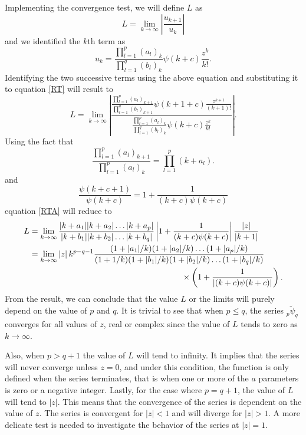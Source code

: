 Implementing the convergence test, we will define $L$ as
\begin{equation} \label{RT}
    L = \lim_{k \to \infty} \left| \frac{u_{k+1}}{u_k} \right| 
\end{equation}
and we identified the $k$th term as
\begin{equation}
    u_k = \frac{\prod_{l=1}^{p} (a_{l})_k}{ \prod_{l=1}^{q} (b_{l})_k} \psi(k+c) \frac{z^k}{k!}.
\end{equation}
Identifying the two successive terms using the above equation and substituting it to equation \eqref{RT} will result to
\begin{equation} \label{RTA}
    L = \lim_{k \to \infty} \left| \frac{\frac{ \prod_{l=1}^{p} (a_{l})_{k+1}}{ \prod_{l=1}^{q} (b_{l})_{k+1}} \psi(k+1+c) \frac{z^{k+1}}{(k+1)!}}{\frac{ \prod_{l=1}^{p} (a_{l})_k}{ \prod_{l=1}^{q} (b_{l})_k} \psi(k+c) \frac{z^k}{k!}} \right|.
\end{equation}
Using the fact that
\begin{equation}
    \frac{ \prod_{l=1}^{p} (a_{l})_{k+1}}{ \prod_{l=1}^{p} (a_{l})_{k}} = \prod_{l=1}^{p} (k+a_l).
\end{equation}
and 
\begin{equation}
    \frac{\psi(k+c+1)}{\psi(k+c)} = 1 + \frac{1}{(k+c)\psi(k+c)}
\end{equation}
equation \eqref{RTA} will reduce to 
\begin{align}
\begin{split} \label{RTA2}
    L &= \lim_{k \to \infty} \frac{|k+a_1||k+a_2| \dots |k+a_{p}|}{|k+b_1||k+b_2| \dots |k+b_{q}|} \left| 1 + \frac{1}{(k+c)\psi(k+c)} \right| \frac{|z|}{|k+1|} 
    \\& = \lim_{k \to \infty} |z| \, k^{p-q-1}  \frac{ (1+|a_1|/k)(1+|a_2|/k) \dots (1+|a_{p}|/k)}{(1+1/k) (1+|b_1|/k)(1+|b_2|/k) \dots (1+|b_{q}|/k)} \\& \hspace{65mm} \times \left( 1 + \frac{1}{|(k+c)\psi(k+c)|} \right).
\end{split}
\end{align}
From the result, we can conclude that the value $L$ or the limits will purely depend on the value of $p$ and $q$. It is trivial to see that when $p \leq q $, the series $_{p}\tilde{\psi}_{q}$ converges for all values of $z$, real or complex since the value of $L$ tends to zero as $k \to \infty$. 

Also, when $p > q + 1 $ the value of $L$ will tend to infinity. It implies that the series will never converge unless $z=0$, and under this condition, the function is only defined when the series terminates, that is when one or more of the $a$ parameters is zero or a negative integer. Lastly, for the case where $p = q+1$, the value of $L$ will tend to $|z|$. This means that the convergence of the series is dependent on the value of $z$. The series is convergent for $|z| < 1$ and will diverge for $|z| > 1$. A more delicate test is needed to investigate the behavior of the series at $|z| = 1$.

